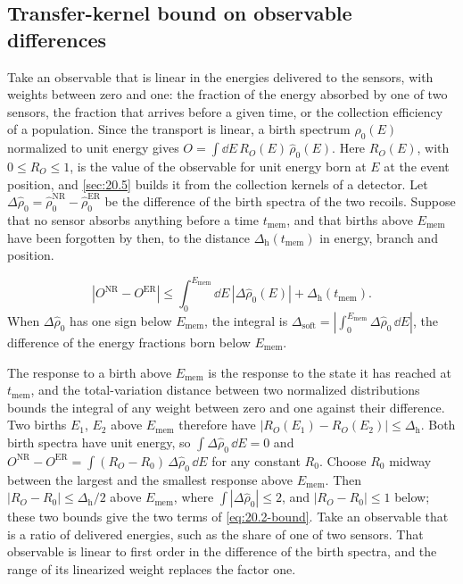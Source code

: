 \subsection{Transfer-kernel bound on observable differences}\label{sec:20.2-bound}

Take an observable that is linear in the energies delivered to the sensors, with weights between zero and one: the fraction of the energy absorbed by one of two sensors, the fraction that arrives before a given time, or the collection efficiency of a population. Since the transport is linear, a birth spectrum $\hat\rho_0(E)$ normalized to unit energy gives $O = \int\dd E\,R_O(E)\,\hat\rho_0(E)$. Here $R_O(E)$, with $0 \le R_O \le 1$, is the value of the observable for unit energy born at $E$ at the event position, and \cref{sec:20.5} builds it from the collection kernels of a detector. Let $\Delta\hat\rho_0 = \hat\rho_0^{\mathrm{NR}} - \hat\rho_0^{\mathrm{ER}}$ be the difference of the birth spectra of the two recoils. Suppose that no sensor absorbs anything before a time $t_{\mathrm{mem}}$, and that births above $E_{\mathrm{mem}}$ have been forgotten by then, to the distance $\Delta_{\mathrm{h}}(t_{\mathrm{mem}})$ in energy, branch and position.
\begin{keyresult}
\begin{equation}
  |O^{\mathrm{NR}} - O^{\mathrm{ER}}| \le \int_0^{E_{\mathrm{mem}}}\dd E\,|\Delta\hat\rho_0(E)| + \Delta_{\mathrm{h}}(t_{\mathrm{mem}}) .
  \label{eq:20.2-bound}
\end{equation}
When $\Delta\hat\rho_0$ has one sign below $E_{\mathrm{mem}}$, the integral is $\Delta_{\mathrm{soft}} = |\int_0^{E_{\mathrm{mem}}}\Delta\hat\rho_0\,\dd E|$, the difference of the energy fractions born below $E_{\mathrm{mem}}$.
\end{keyresult}
\noindent The response to a birth above $E_{\mathrm{mem}}$ is the response to the state it has reached at $t_{\mathrm{mem}}$, and the total-variation distance between two normalized distributions bounds the integral of any weight between zero and one against their difference. Two births $E_1$, $E_2$ above $E_{\mathrm{mem}}$ therefore have $|R_O(E_1) - R_O(E_2)| \le \Delta_{\mathrm{h}}$. Both birth spectra have unit energy, so $\int\Delta\hat\rho_0\,\dd E = 0$ and $O^{\mathrm{NR}} - O^{\mathrm{ER}} = \int(R_O - R_0)\,\Delta\hat\rho_0\,\dd E$ for any constant $R_0$. Choose $R_0$ midway between the largest and the smallest response above $E_{\mathrm{mem}}$. Then $|R_O - R_0| \le \Delta_{\mathrm{h}}/2$ above $E_{\mathrm{mem}}$, where $\int|\Delta\hat\rho_0| \le 2$, and $|R_O - R_0| \le 1$ below; these two bounds give the two terms of \cref{eq:20.2-bound}. Take an observable that is a ratio of delivered energies, such as the share of one of two sensors. That observable is linear to first order in the difference of the birth spectra, and the range of its linearized weight replaces the factor one.

